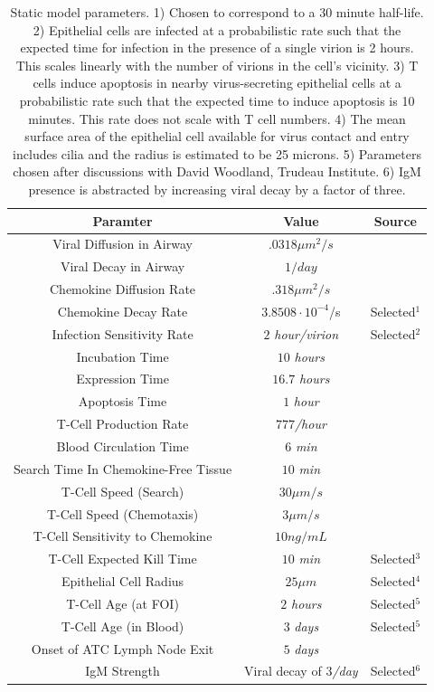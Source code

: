 \documentclass[10pt]{article}
\begin{document}
\begin{table}
\begin{center}
\begin{tabular}{ | c | c | c | }
  \hline                        
  Paramter & Value & Source \\
  \hline
  Viral Diffusion in Airway & $.0318 \mu m^2/s$ & \cite{Beauchemin2006} \\
  Viral Decay in Airway &  $1/day$ & \cite{Lee2009} \\
  Chemokine Diffusion Rate & $.318 \mu m^2/s$ & \cite{Beauchemin2006} \\
  Chemokine Decay Rate &  $3.8508\cdot10^{-4}$/s & Selected$^1$\\
  Infection Sensitivity Rate &  $2$ \textit{hour/virion} &  Selected$^2$ \\
  Incubation Time &  $10$ \textit{hours} & \cite{Mitchell2011} \\
  Expression Time &  $16.7$ \textit{hours} & \cite{Mitchell2011} \\
  Apoptosis Time & $1$ \textit{hour} & \cite{Ganusov2008} \\
  T-Cell Production Rate & $777$\textit{/hour} & \cite{Miao2010} \\ 
  Blood Circulation Time & $6$ \textit{min} & \cite{Banerjee2010b} \\
  Search Time In Chemokine-Free Tissue & $10$ \textit{min} & \cite{Banerjee2010b} \\
  T-Cell Speed (Search) & $30 \mu m/s$ & \cite{Miller2003} \\
  T-Cell Speed (Chemotaxis) & $3 \mu m/s$ & \cite{Miller2003} \\
  T-Cell Sensitivity to Chemokine & $10 ng/mL$ & \cite{Gao2003} \\
  T-Cell Expected Kill Time & $10$ \textit{min} & Selected$^3$ \\
  Epithelial Cell Radius & $25 \mu m$ & Selected$^4$ \\
  T-Cell Age (at FOI) & $2$ \textit{hours} & Selected$^5$ \\
  T-Cell Age (in Blood) & $3$ \textit{days} & Selected$^5$ \\
  Onset of ATC Lymph Node Exit & $5$ \textit{days} & \cite{Banerjee2011} \\
  IgM Strength & Viral decay of $3$\textit{/day} & Selected$^6$ \\
  \hline  
\end{tabular}
\caption{Static model parameters.  1) Chosen to correspond to a 30 minute half-life.  2) Epithelial cells are infected at a probabilistic rate such that the expected time for infection in the presence of a single virion is 2 hours.  This scales linearly with the number of virions in the cell's vicinity.  3) T cells induce apoptosis in nearby virus-secreting epithelial cells at a probabilistic rate such that the expected time to induce apoptosis is 10 minutes.  This rate does not scale with T cell numbers.  4)  The mean surface area of the epithelial cell available for virus contact and entry includes cilia and the radius is estimated to be 25 microns. 5) Parameters chosen after discussions with David Woodland, Trudeau Institute.  6) IgM presence is abstracted by increasing viral decay by a factor of three. }

\end{center}
\end{table}
\end{document}
